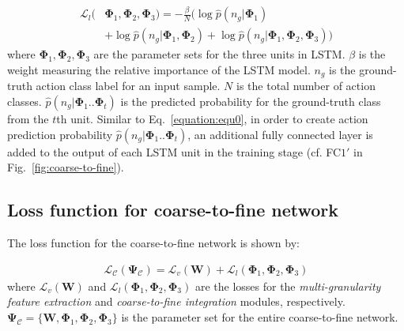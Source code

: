 \documentclass[letterpaper]{article}
\begin{document}
\begin{equation}
\begin{aligned}
\mathcal{L}_l(&\mathbf{\Phi}_1,\mathbf{\Phi}_2,\mathbf{\Phi}_3)=-\frac{\beta}{N} ( \log{\hat{p}(n_g|\mathbf{\Phi}_1)}\\&+
\log{\hat{p}(n_g|\mathbf{\Phi}_1,\mathbf{\Phi}_2)}+\log{\hat{p}(n_g|\mathbf{\Phi}_1,\mathbf{\Phi}_2,\mathbf{\Phi}_3)}  )
\end{aligned}
\label{equation:equ3}
\end{equation}
where $\mathbf{\Phi}_1,\mathbf{\Phi}_2,\mathbf{\Phi}_3$ are the parameter sets for the three units in LSTM. $\beta$ is the weight measuring the relative importance of the LSTM model. $n_g$ is the ground-truth action class label for an input sample. $N$ is the total number of action classes. $\hat{p}(n_g|\mathbf{\Phi}_1..\mathbf{\Phi}_t)$ is the predicted probability for the ground-truth class from the $t$th unit. Similar to Eq.~\ref{equation:equ0}, in order to create action prediction probability $\hat{p}(n_g|\mathbf{\Phi}_1..\mathbf{\Phi}_t)$, an additional fully connected layer is added to the output of each LSTM unit in the training stage (cf. FC$1'$ in Fig.~\ref{fig:coarse-to-fine}).




\subsection{Loss function for coarse-to-fine network}

The loss function for the coarse-to-fine network is shown by: %

\begin{equation}
\begin{aligned}
\mathcal{L}_{\mathcal{C}}(\mathbf{\Psi}_{\mathcal{C}})=\mathcal{L}_v(\mathbf{W})+\mathcal{L}_l(\mathbf{\Phi}_1,\mathbf{\Phi}_2,\mathbf{\Phi}_3)%
\end{aligned}
\label{equation:equ44}
\end{equation}
where $\mathcal{L}_v(\mathbf{W})$ and $\mathcal{L}_l(\mathbf{\Phi}_1,\mathbf{\Phi}_2,\mathbf{\Phi}_3)$ are the losses for the \emph{multi-granularity feature extraction} and \emph{coarse-to-fine integration} modules, respectively. $\mathbf{\Psi_{\mathcal{C}}}=\{\mathbf{W},\mathbf{\Phi}_1,\mathbf{\Phi}_2,\mathbf{\Phi}_3\}$ is the parameter set for the entire coarse-to-fine network.%
\end{document}
